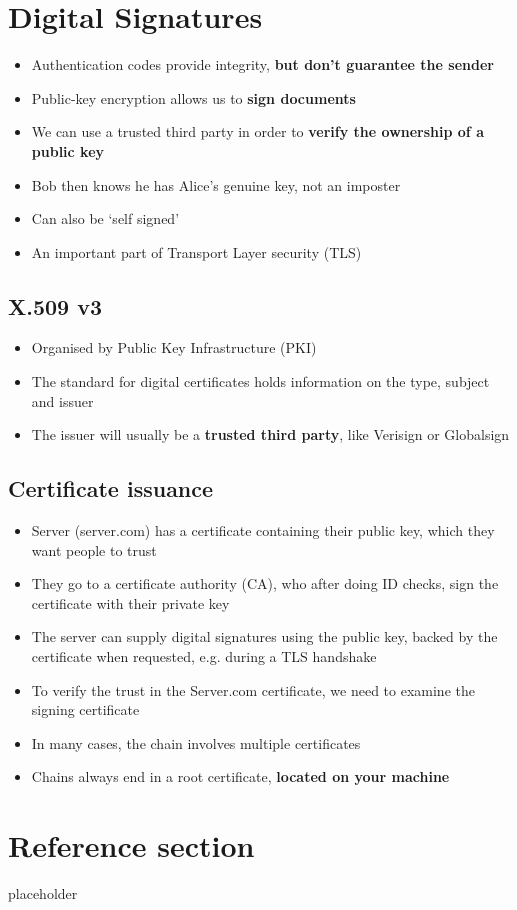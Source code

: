 \documentclass{article}
\begin{document}
\section{Digital Signatures}
\begin{itemize}
  \item Authentication codes provide integrity, \textbf{but don’t guarantee the sender }
  \item Public-key encryption allows us to \textbf{sign documents}
  \item We can use a trusted third party in order to \textbf{verify the ownership of a public key} 
  \item Bob then knows he has Alice’s genuine key, not an imposter 
  \item Can also be ‘self signed’ 
  \item An important part of Transport Layer security (TLS)
\end{itemize}

\subsection{X.509 v3}
\begin{itemize}
  \item Organised by Public Key Infrastructure (PKI) 
  \item The standard for digital certificates holds information on the type, subject and issuer 
  \item The issuer will usually be a \textbf{trusted third party}, like Verisign or Globalsign
\end{itemize}

\subsection{Certificate issuance}
\begin{itemize}
  \item Server (server.com) has a certificate containing their public key, which they want people to trust
  \item They go to a certificate authority (CA), who after doing ID checks, sign the certificate with their private key
  \item The server can supply digital signatures using the public key, backed by the certificate when requested, e.g. during a TLS handshake
  \item To verify the trust in the Server.com certificate, we need to examine the signing certificate
  \item In many cases, the chain involves multiple certificates 
  \item Chains always end in a root certificate, \textbf{located on your machine}
\end{itemize}

\pagebreak
\section*{Reference section} \label{sec:reference}
\begin{description}
	\item[placeholder] \hfill \\
\end{description}
\end{document}
